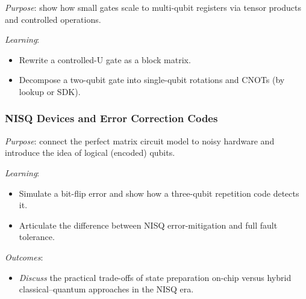 \emph{Purpose}: show how small gates scale to multi-qubit registers via tensor products and controlled operations.

\emph{Learning}:
\begin{itemize}
	\item Rewrite a controlled-U gate as a block matrix.
	\item Decompose a two-qubit gate into single-qubit rotations and CNOTs (by lookup or SDK).
\end{itemize}



\subsubsection{NISQ Devices and Error Correction Codes}

\emph{Purpose}: connect the perfect matrix circuit model to noisy hardware and introduce the idea of logical (encoded) qubits.

\emph{Learning}:
\begin{itemize}
	\item Simulate a bit-flip error and show how a three-qubit repetition code detects it.
	\item Articulate the difference between NISQ error-mitigation and full fault tolerance.
\end{itemize}

\emph{Outcomes}:
\begin{itemize}
	\item \emph{Discuss} the practical trade-offs of state preparation on-chip versus hybrid classical–quantum approaches in the NISQ era.
\end{itemize}



